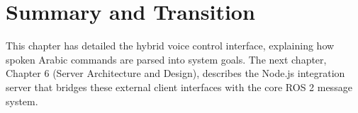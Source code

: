 \section{Summary and Transition}
This chapter has detailed the hybrid voice control interface, explaining how spoken Arabic commands are parsed into system goals. The next chapter, Chapter 6 (Server Architecture and Design), describes the Node.js integration server that bridges these external client interfaces with the core ROS 2 message system.